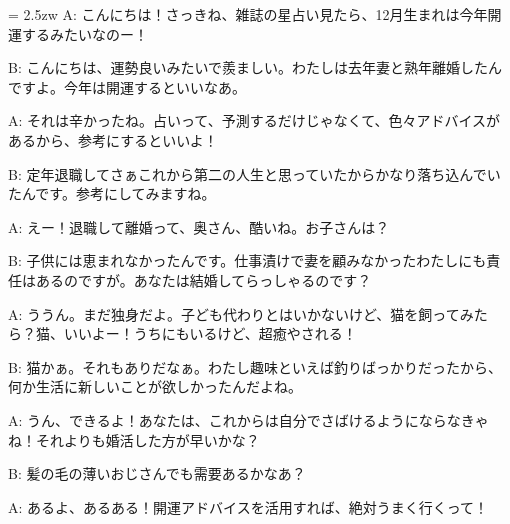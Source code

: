 \documentclass[11pt]{amsart}
\title{}
\author{}
\newenvironment{hangall}[1]{\hangindent = 2.5zw\everypar{\hangindent = 2.5zw}}{}
\begin{document}
\maketitle
\begin{hangall}{}%
A: こんにちは！さっきね、雑誌の星占い見たら、12月生まれは今年開運するみたいなのー！



B: こんにちは、運勢良いみたいで羨ましい。わたしは去年妻と熟年離婚したんですよ。今年は開運するといいなあ。



A: それは辛かったね。占いって、予測するだけじゃなくて、色々アドバイスがあるから、参考にするといいよ！



B: 定年退職してさぁこれから第二の人生と思っていたからかなり落ち込んでいたんです。参考にしてみますね。



A: えー！退職して離婚って、奥さん、酷いね。お子さんは？



B: 子供には恵まれなかったんです。仕事漬けで妻を顧みなかったわたしにも責任はあるのですが。あなたは結婚してらっしゃるのです？



A: ううん。まだ独身だよ。子ども代わりとはいかないけど、猫を飼ってみたら？猫、いいよー！うちにもいるけど、超癒やされる！



B: 猫かぁ。それもありだなぁ。わたし趣味といえば釣りばっかりだったから、何か生活に新しいことが欲しかったんだよね。



A: うん、できるよ！あなたは、これからは自分でさばけるようにならなきゃね！それよりも婚活した方が早いかな？



B: 髪の毛の薄いおじさんでも需要あるかなあ？



A: あるよ、あるある！開運アドバイスを活用すれば、絶対うまく行くって！\end{hangall}
\end{document}
